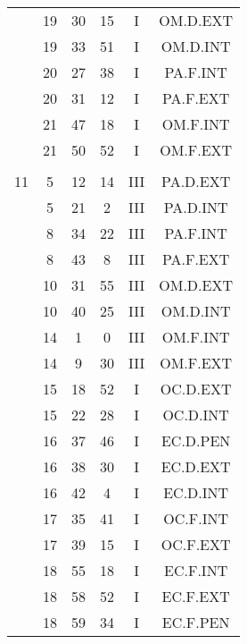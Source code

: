 \documentclass[12pt, a4paper]{article}
\begin{document}
\begin{multicols}{3}
{\begin{tabular}{c c c c c c}
	 	 	 	 & 19 & 30 & 15 & I & OM.D.EXT\\%
	 	 	 	 & 19 & 33 & 51 & I & OM.D.INT\\%
	 	 	 	 & 20 & 27 & 38 & I & PA.F.INT\\%
	 	 	 	 & 20 & 31 & 12 & I & PA.F.EXT\\%
	 	 	 	 & 21 & 47 & 18 & I & OM.F.INT\\%
	 	 	 	 & 21 & 50 & 52 & I & OM.F.EXT\\%
	 	 	 	 & & & & & \\%
	 	 	 	11 & 5 & 12 & 14 & III & PA.D.EXT\\%
	 	 	 	 & 5 & 21 & 2 & III & PA.D.INT\\%
	 	 	 	 & 8 & 34 & 22 & III & PA.F.INT\\%
	 	 	 	 & 8 & 43 & 8 & III & PA.F.EXT\\%
	 	 	 	 & 10 & 31 & 55 & III & OM.D.EXT\\%
	 	 	 	 & 10 & 40 & 25 & III & OM.D.INT\\%
	 	 	 	 & 14 & 1 & 0 & III & OM.F.INT\\%
	 	 	 	 & 14 & 9 & 30 & III & OM.F.EXT\\%
	 	 	 	 & 15 & 18 & 52 & I & OC.D.EXT\\%
	 	 	 	 & 15 & 22 & 28 & I & OC.D.INT\\%
	 	 	 	 & 16 & 37 & 46 & I & EC.D.PEN\\%
	 	 	 	 & 16 & 38 & 30 & I & EC.D.EXT\\%
	 	 	 	 & 16 & 42 & 4 & I & EC.D.INT\\%
	 	 	 	 & 17 & 35 & 41 & I & OC.F.INT\\%
	 	 	 	 & 17 & 39 & 15 & I & OC.F.EXT\\%
	 	 	 	 & 18 & 55 & 18 & I & EC.F.INT\\%
	 	 	 	 & 18 & 58 & 52 & I & EC.F.EXT\\%
	 	 	 	 & 18 & 59 & 34 & I & EC.F.PEN\\%
	 	 \end{tabular}
 	}
\end{multicols}
\end{document}
